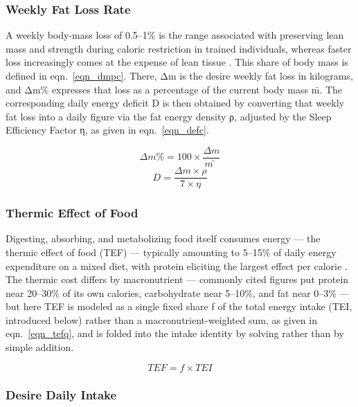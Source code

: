 \subsubsection{Weekly Fat Loss Rate}

A weekly body-mass loss of 0.5–1\% is the range associated with preserving lean mass and strength during caloric restriction in trained individuals, whereas faster loss increasingly comes at the expense of lean tissue \cite{ref_garthe2011}. This share of body mass is defined in eqn.~\eqref{eqn_dmpc}. There, Δm is the desire weekly fat loss in kilograms, and Δm\% expresses that loss as a percentage of the current body mass m̄. The corresponding daily energy deficit D is then obtained by converting that weekly fat loss into a daily figure via the fat energy density ρ, adjusted by the Sleep Efficiency Factor η, as given in eqn.~\eqref{eqn_defc}.

\begin{equation}
\label{eqn_dmpc}
Δm\% = 100 × \frac{Δm}{m̄}
\end{equation}
\begin{equation}
\label{eqn_defc}
D = \frac{Δm × ρ}{7 × η}
\end{equation}

\subsubsection{Thermic Effect of Food}

Digesting, absorbing, and metabolizing food itself consumes energy — the thermic effect of food (TEF) — typically amounting to 5–15\% of daily energy expenditure on a mixed diet, with protein eliciting the largest effect per calorie \cite{ref_westerterp2004}. The thermic cost differs by macronutrient — commonly cited figures put protein near 20–30\% of its own calories, carbohydrate near 5–10\%, and fat near 0–3\% \cite{ref_westerterp2004} — but here TEF is modeled as a single fixed share f of the total energy intake (TEI, introduced below) rather than a macronutrient-weighted sum, as given in eqn.~\eqref{eqn_tefq}, and is folded into the intake identity by solving rather than by simple addition.

\begin{equation}
\label{eqn_tefq}
TEF = f × TEI
\end{equation}

\subsubsection{Desire Daily Intake}

